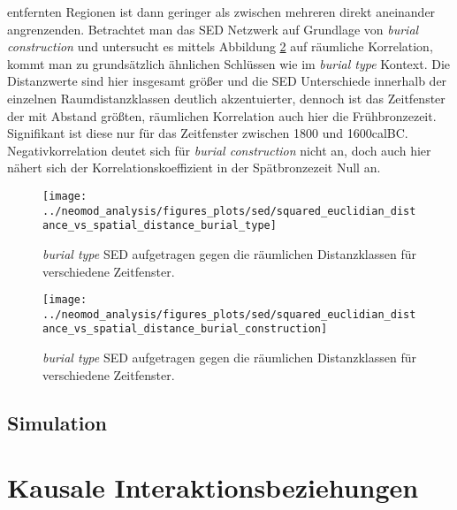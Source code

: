 \documentclass[openany,twoside,twocolumn]{book}
\begin{document}
entfernten Regionen ist dann geringer als zwischen mehreren direkt
aneinander angrenzenden. Betrachtet man das SED Netzwerk auf Grundlage
von \emph{burial construction} und untersucht es mittels Abbildung
\ref{fig:mantel-bc-spatial} auf räumliche Korrelation, kommt man zu
grundsätzlich ähnlichen Schlüssen wie im \emph{burial type} Kontext. Die
Distanzwerte sind hier insgesamt größer und die SED Unterschiede
innerhalb der einzelnen Raumdistanzklassen deutlich akzentuierter,
dennoch ist das Zeitfenster der mit Abstand größten, räumlichen
Korrelation auch hier die Frühbronzezeit. Signifikant ist diese nur für
das Zeitfenster zwischen 1800 und 1600calBC. Negativkorrelation deutet
sich für \emph{burial construction} nicht an, doch auch hier nähert sich
der Korrelationskoeffizient in der Spätbronzezeit Null an.

\begin{landscape}
\begin{figure}
\texttt{[image: ../neomod\_analysis/figures\_plots/sed/squared\_euclidian\_distance\_vs\_spatial\_distance\_burial\_type]} \caption[\textit{burial type} SED aufgetragen gegen die räumlichen Distanzklassen für verschiedene Zeitfenster]{\textit{burial type} SED aufgetragen gegen die räumlichen Distanzklassen für verschiedene Zeitfenster.}\label{fig:mantel-bt-spatial}
\end{figure}
\end{landscape}

\begin{landscape}
\begin{figure}
\texttt{[image: ../neomod\_analysis/figures\_plots/sed/squared\_euclidian\_distance\_vs\_spatial\_distance\_burial\_construction]} \caption[\textit{burial type} SED aufgetragen gegen die räumlichen Distanzklassen für verschiedene Zeitfenster]{\textit{burial type} SED aufgetragen gegen die räumlichen Distanzklassen für verschiedene Zeitfenster.}\label{fig:mantel-bc-spatial}
\end{figure}
\end{landscape}

\hypertarget{simulation-1}{%
\subsection{Simulation}\label{simulation-1}}

\hypertarget{kausale-interaktionsbeziehungen}{%
\section{Kausale
Interaktionsbeziehungen}\label{kausale-interaktionsbeziehungen}}
\end{document}
